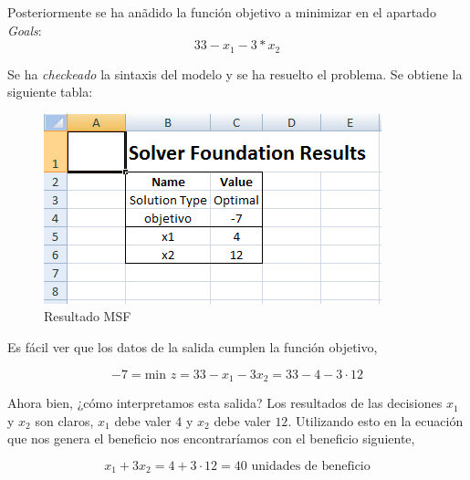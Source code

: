 \documentclass[a4paper,12pt]{article}
\begin{document}
Posteriormente se ha an\~adido la funci\'on objetivo a minimizar en el apartado \textit{Goals}: $$33 - x_1 -3*x_2$$

Se ha \textit{checkeado} la sintaxis del modelo y se ha resuelto el problema. Se obtiene la siguiente tabla:\\

\begin{figure}[h]
  \centering
	\includegraphics[scale=0.7]{msf.png}
	  \caption{Resultado MSF}
\end{figure}

Es f\'acil ver que los datos de la salida cumplen la funci\'on objetivo,

$$ -7 = \text{min }z = 33 - x_1 - 3x_2 = 33 - 4 - 3 \cdot 12$$

Ahora bien, ¿c\'omo interpretamos esta salida? Los resultados de las decisiones $x_1$ y $x_2$ son claros, $x_1$ debe valer $4$ y $x_2$ debe valer $12$. Utilizando esto en la ecuaci\'on que nos genera el beneficio nos encontrar\'iamos con el beneficio siguiente,

$$ x_1 + 3x_2 = 4 + 3 \cdot 12 = 40 \text{ unidades de beneficio}$$ 
\end{document}
